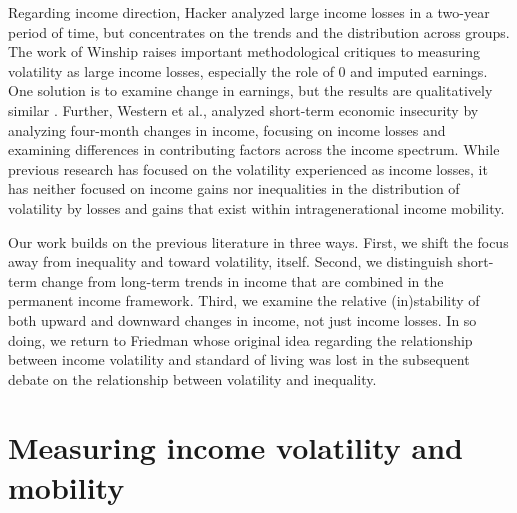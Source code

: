 \documentclass[12pt]{article}
\begin{document}
Regarding income direction, Hacker \citeyearpar{hacker_2006} analyzed large income losses in a two-year period of time, but concentrates on the trends and the distribution across groups. The work of Winship \citeyearpar{winship_2011} raises important methodological critiques to measuring volatility as large income losses, especially the role of 0 and imputed earnings. One solution is to examine change in earnings, but the results are qualitatively similar \citep{shin_solon_2011,dynan_etal_2012}. Further, Western et al., \citeyearpar{western_etal_2016} analyzed short-term economic insecurity by analyzing four-month changes in income, focusing on income losses and examining differences in contributing factors across the income spectrum. While previous research has focused on the volatility experienced as income losses, it has neither focused on income gains nor inequalities in the distribution of volatility by losses and gains that exist within intragenerational income mobility.

Our work builds on the previous literature in three ways. First, we shift the focus away from inequality and toward volatility, itself. Second, we distinguish short-term change from long-term trends in income that are combined in the permanent income framework. Third, we examine the relative (in)stability of both upward and downward changes in income, not just income losses. In so doing, we return to Friedman \citeyearpar{friedman_1957} whose original idea regarding the relationship between income volatility and standard of living was lost in the subsequent debate on the relationship between volatility and inequality.

\section{Measuring income volatility and mobility}
\end{document}
